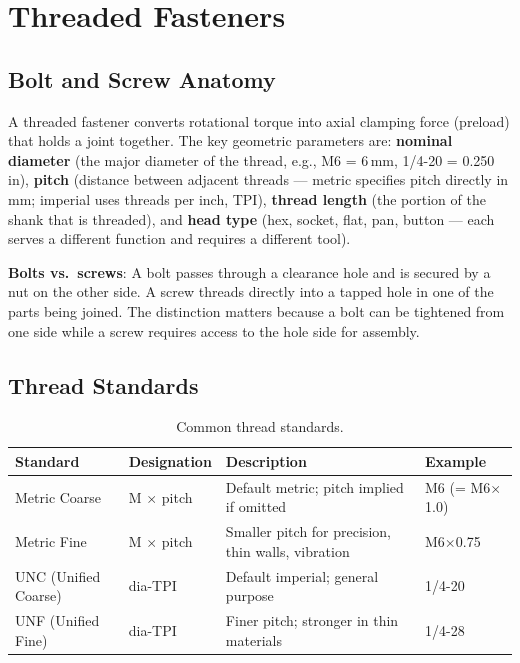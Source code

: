 \documentclass[11pt,letterpaper,twoside,openany]{book}
\begin{document}
\vspace{1em}

\FloatBarrier
\section{Threaded Fasteners}

\subsection{Bolt and Screw Anatomy}
A threaded fastener converts rotational torque into axial clamping force (preload) that holds a joint together. The key geometric parameters are: \textbf{nominal diameter} (the major diameter of the thread, e.g., M6 = 6\,mm, 1/4-20 = 0.250\,in), \textbf{pitch} (distance between adjacent threads --- metric specifies pitch directly in mm; imperial uses threads per inch, TPI), \textbf{thread length} (the portion of the shank that is threaded), and \textbf{head type} (hex, socket, flat, pan, button --- each serves a different function and requires a different tool).

\textbf{Bolts vs.\ screws}: A bolt passes through a clearance hole and is secured by a nut on the other side. A screw threads directly into a tapped hole in one of the parts being joined. The distinction matters because a bolt can be tightened from one side while a screw requires access to the hole side for assembly.

\subsection{Thread Standards}

\begin{table}[ht!]
\centering\small
\begin{tabularx}{\textwidth}{l l X l}
\toprule
\textbf{Standard} & \textbf{Designation} & \textbf{Description} & \textbf{Example} \\
\midrule
Metric Coarse & M $\times$ pitch & Default metric; pitch implied if omitted & M6 (= M6$\times$1.0) \\
Metric Fine & M $\times$ pitch & Smaller pitch for precision, thin walls, vibration & M6$\times$0.75 \\
UNC (Unified Coarse) & dia-TPI & Default imperial; general purpose & 1/4-20 \\
UNF (Unified Fine) & dia-TPI & Finer pitch; stronger in thin materials & 1/4-28 \\
\bottomrule
\end{tabularx}
\caption{Common thread standards.}
\end{table}
\end{document}

